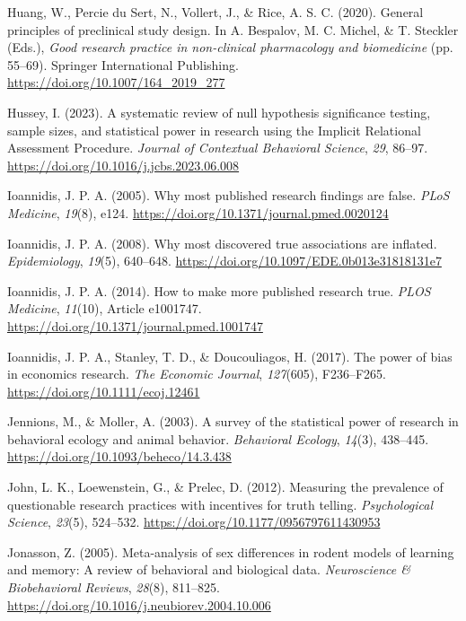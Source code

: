 \documentclass[authordate, meta]{jote-new-article}
\begin{document}
	Huang, W., Percie du Sert, N., Vollert, J., \& Rice, A. S. C. (2020). General principles of preclinical study design. In A. Bespalov, M. C. Michel, \& T. Steckler (Eds.), \emph{Good research practice in non-clinical pharmacology and biomedicine} (pp. 55--69). Springer International Publishing. \url{https://doi.org/10.1007/164\_2019\_277}



	Hussey, I. (2023). A systematic review of null hypothesis significance testing, sample sizes, and statistical power in research using the Implicit Relational Assessment Procedure. \emph{Journal of Contextual Behavioral Science}, \emph{29}, 86--97. \url{https://doi.org/10.1016/j.jcbs.2023.06.008}



	Ioannidis, J. P. A. (2005). Why most published research findings are false. \emph{PLoS Medicine}, \emph{19}(8), e124. \url{https://doi.org/10.1371/journal.pmed.0020124}



	Ioannidis, J. P. A. (2008). Why most discovered true associations are inflated. \emph{Epidemiology}, \emph{19}(5), 640--648. \url{https://doi.org/10.1097/EDE.0b013e31818131e7}



	Ioannidis, J. P. A. (2014). How to make more published research true. \emph{PLOS Medicine}, \emph{11}(10), Article e1001747. \url{https://doi.org/10.1371/journal.pmed.1001747}



	Ioannidis, J. P. A., Stanley, T. D., \& Doucouliagos, H. (2017). The power of bias in economics research. \emph{The Economic Journal}, \emph{127}(605), F236--F265. \url{https://doi.org/10.1111/ecoj.12461}



	Jennions, M., \& Moller, A. (2003). A survey of the statistical power of research in behavioral ecology and animal behavior. \emph{Behavioral Ecology}, \emph{14}(3), 438--445. \url{https://doi.org/10.1093/beheco/14.3.438}



	John, L. K., Loewenstein, G., \& Prelec, D. (2012). Measuring the prevalence of questionable research practices with incentives for truth telling. \emph{Psychological Science}, \emph{23}(5), 524--532. \url{https://doi.org/10.1177/0956797611430953}



	Jonasson, Z. (2005). Meta-analysis of sex differences in rodent models of learning and memory: A review of behavioral and biological data. \emph{Neuroscience \& Biobehavioral Reviews}, \emph{28}(8), 811--825. \url{https://doi.org/10.1016/j.neubiorev.2004.10.006}
\end{document}
